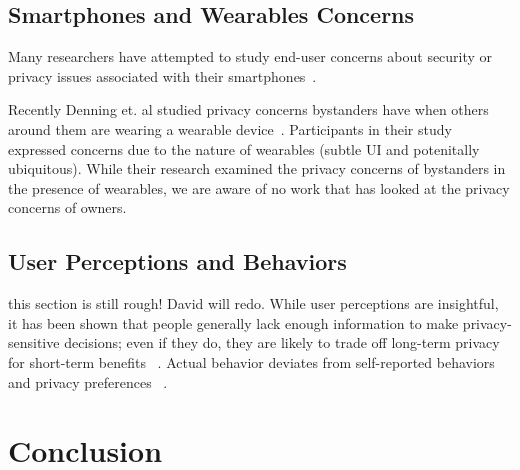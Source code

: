 \documentclass{acm_proc_article-sp}
\begin{document}
\subsection{Smartphones and Wearables Concerns}
Many researchers have attempted to study end-user concerns about security or privacy issues associated with their smartphones~\cite{chin2012measuring, palen2000going, felt2012android}. 

Recently Denning et. al studied privacy concerns bystanders have when others around them are wearing a wearable device~\cite{Denning2014}. Participants in their study expressed concerns due to the nature of wearables (subtle UI and potenitally ubiquitous). While their research examined the privacy concerns of bystanders in the presence of wearables, we are aware of no work that has looked at the privacy concerns of owners.

\subsection{User Perceptions and Behaviors}
{\color{red} this section is still rough! David will redo.} 
While user perceptions are insightful, it has been shown that people generally lack enough information to make privacy-sensitive decisions; even if they do, they are likely to trade off long-term privacy for short-term benefits ~\cite{acquisti2005privacy}. Actual behavior deviates from self-reported behaviors ~\cite{jensen2005privacy} and privacy preferences ~\cite{spiekermann2001privacy}. 



\section{Conclusion}
\end{document}
